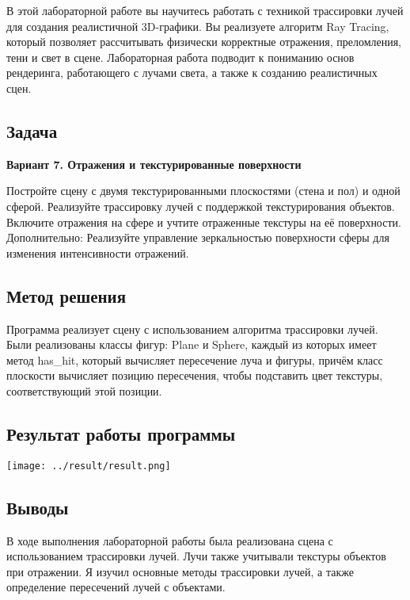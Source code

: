 \documentclass[12pt]{article}
\begin{document}
В этой лабораторной работе вы научитесь работать с техникой трассировки лучей для
создания реалистичной 3D-графики. Вы реализуете алгоритм Ray Tracing, который позволяет
рассчитывать физически корректные отражения, преломления, тени и свет в сцене.
Лабораторная работа подводит к пониманию основ рендеринга, работающего с лучами
света, а также к созданию реалистичных сцен.

\subsection*{Задача}

\textbf{Вариант 7. Отражения и текстурированные поверхности}

Постройте сцену с двумя текстурированными плоскостями (стена и пол) и одной сферой.
Реализуйте трассировку лучей с поддержкой текстурирования объектов.
Включите отражения на сфере и учтите отраженные текстуры на её поверхности.
Дополнительно: Реализуйте управление зеркальностью поверхности сферы для
изменения интенсивности отражений.

\subsection*{Метод решения}

Программа реализует сцену с использованием алгоритма трассировки лучей. Были реализованы классы фигур:
Plane и Sphere, каждый из которых имеет метод has\_hit, который вычисляет пересечение луча и фигуры,
причём класс плоскости вычисляет позицию пересечения, чтобы подставить цвет текстуры, соответствующий этой позиции.

\subsection*{Результат работы программы}

\texttt{[image: ../result/result.png]}

\subsection*{Выводы}

В ходе выполнения лабораторной работы была реализована сцена с использованием трассировки лучей.
Лучи также учитывали текстуры объектов при отражении. Я изучил основные методы трассировки лучей, а также
определение пересечений лучей с объектами.
\end{document}
